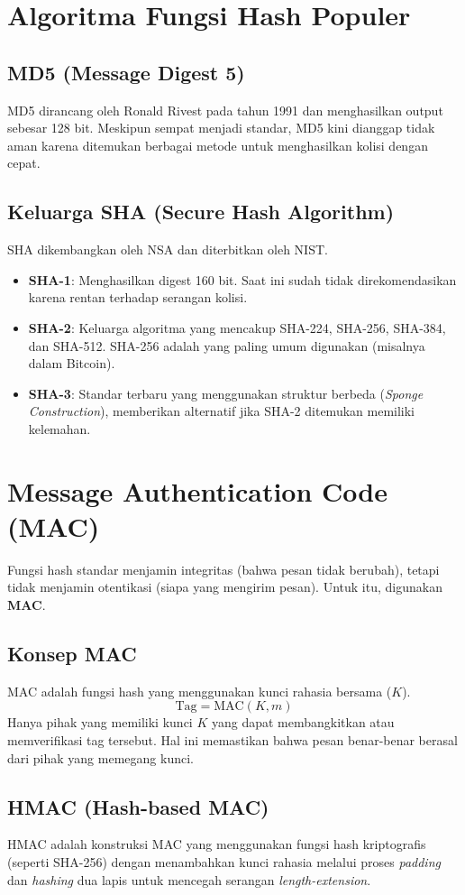 \documentclass[../main.tex]{subfiles}
\begin{document}
\section{Algoritma Fungsi Hash Populer}
\subsection{MD5 (Message Digest 5)}
MD5 dirancang oleh Ronald Rivest pada tahun 1991 dan menghasilkan output sebesar 128 bit. Meskipun sempat menjadi standar, MD5 kini dianggap tidak aman karena ditemukan berbagai metode untuk menghasilkan kolisi dengan cepat.

\subsection{Keluarga SHA (Secure Hash Algorithm)}
SHA dikembangkan oleh NSA dan diterbitkan oleh NIST.
\begin{itemize}
    \item \textbf{SHA-1}: Menghasilkan digest 160 bit. Saat ini sudah tidak direkomendasikan karena rentan terhadap serangan kolisi.
    \item \textbf{SHA-2}: Keluarga algoritma yang mencakup SHA-224, SHA-256, SHA-384, dan SHA-512. SHA-256 adalah yang paling umum digunakan (misalnya dalam Bitcoin).
    \item \textbf{SHA-3}: Standar terbaru yang menggunakan struktur berbeda (\textit{Sponge Construction}), memberikan alternatif jika SHA-2 ditemukan memiliki kelemahan.
\end{itemize}

\section{Message Authentication Code (MAC)}
Fungsi hash standar menjamin integritas (bahwa pesan tidak berubah), tetapi tidak menjamin otentikasi (siapa yang mengirim pesan). Untuk itu, digunakan \textbf{MAC}.

\subsection{Konsep MAC}
MAC adalah fungsi hash yang menggunakan kunci rahasia bersama ($K$).
\[ \text{Tag} = \text{MAC}(K, m) \]
Hanya pihak yang memiliki kunci $K$ yang dapat membangkitkan atau memverifikasi tag tersebut. Hal ini memastikan bahwa pesan benar-benar berasal dari pihak yang memegang kunci.

\subsection{HMAC (Hash-based MAC)}
HMAC adalah konstruksi MAC yang menggunakan fungsi hash kriptografis (seperti SHA-256) dengan menambahkan kunci rahasia melalui proses \textit{padding} dan \textit{hashing} dua lapis untuk mencegah serangan \textit{length-extension}.
\end{document}
